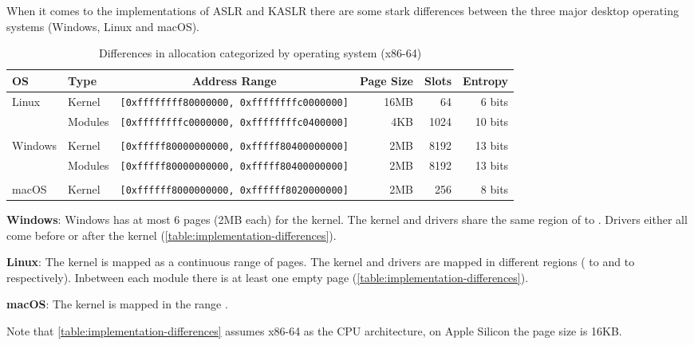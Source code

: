 When it comes to the implementations of ASLR and KASLR there are some stark differences between the three major desktop operating systems (Windows, Linux and macOS).

\begin{table*}[!ht]
  \small
  \centering
  \begin{tabular}{llcrrr}
  \hline
    \textbf{OS} & \textbf{Type} & \textbf{Address Range} & \textbf{Page Size} & \textbf{Slots} & \textbf{Entropy} \\ \hline
    \multirow{2}{*}{Linux}   & Kernel  & {\lstinline[basicstyle=\ttfamily]![0xffffffff80000000, 0xffffffffc0000000]!} & 16MB &   64 &  6 bits \\
                             & Modules & {\lstinline[basicstyle=\ttfamily]![0xffffffffc0000000, 0xffffffffc0400000]!} &  4KB & 1024 & 10 bits \\ \\
    \multirow{2}{*}{Windows} & Kernel  & {\lstinline[basicstyle=\ttfamily]![0xfffff80000000000, 0xfffff80400000000]!} &  2MB & 8192 & 13 bits \\
                             & Modules & {\lstinline[basicstyle=\ttfamily]![0xfffff80000000000, 0xfffff80400000000]!} &  2MB & 8192 & 13 bits \\ \\
    macOS   & Kernel  & {\lstinline[basicstyle=\ttfamily]![0xffffff8000000000, 0xffffff8020000000]!} &  2MB &  256 &  8 bits \\ \hline
  \end{tabular}
  \caption{Differences in allocation categorized by operating system (x86-64) {\cite[Table~2]{drk}}}
  \label{table:implementation-differences}
\end{table*}

\textbf{Windows}: Windows has at most 6 pages (2MB each) for the kernel.
The kernel and drivers share the same region of  to .
Drivers either all come before or after the kernel (\autoref{table:implementation-differences}). \cite{drk}

\textbf{Linux}: The kernel is mapped as a continuous range of pages.
The kernel and drivers are mapped in different regions ( to  and  to  respectively).
Inbetween each module there is at least one empty page (\autoref{table:implementation-differences}). \cite{drk}

\textbf{macOS}: The kernel is mapped in the range . \cite{drk}

Note that \autoref{table:implementation-differences} assumes x86-64 as the CPU architecture, on Apple Silicon the page size is 16KB.
